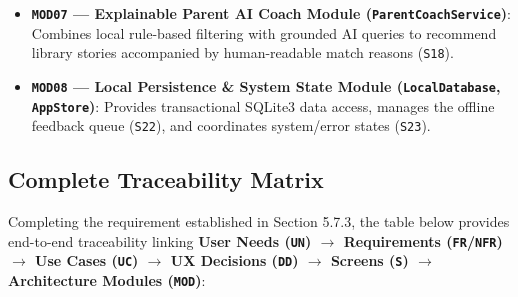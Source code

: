 \begin{itemize}
  \item \textbf{\texttt{MOD07} — Explainable Parent AI Coach Module (\texttt{ParentCoachService})}: Combines local rule-based filtering with grounded AI queries to recommend library stories accompanied by human-readable match reasons (\texttt{S18}).
  \item \textbf{\texttt{MOD08} — Local Persistence \& System State Module (\texttt{LocalDatabase}, \texttt{AppStore})}: Provides transactional SQLite3 data access, manages the offline feedback queue (\texttt{S22}), and coordinates system/error states (\texttt{S23}).
\end{itemize}



\subsection{Complete Traceability Matrix}


Completing the requirement established in Section 5.7.3, the table below provides end-to-end traceability linking \textbf{User Needs (\texttt{UN}) $\rightarrow$ Requirements (\texttt{FR}/\texttt{NFR}) $\rightarrow$ Use Cases (\texttt{UC}) $\rightarrow$ UX Decisions (\texttt{DD}) $\rightarrow$ Screens (\texttt{S}) $\rightarrow$ Architecture Modules (\texttt{MOD})}:

